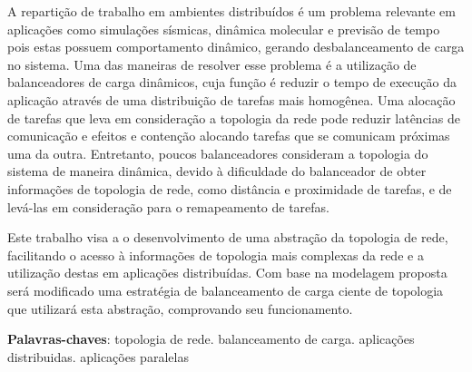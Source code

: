 \documentclass[
	12pt,				%
	openright,			%
	twoside,			%
	a4paper,			%
	english,			%
	brazil,				%
	]{abntex2}
\begin{document}
\begin{resumo}

A repartição de trabalho em ambientes distribuídos é um problema relevante em aplicações como simulações sísmicas, dinâmica molecular e previsão de tempo pois estas possuem comportamento dinâmico, gerando desbalanceamento de carga no sistema. 
Uma das maneiras de resolver esse problema é a utilização de balanceadores de carga dinâmicos, cuja função é reduzir o tempo de execução da aplicação através de uma distribuição de tarefas mais homogênea. 
Uma alocação de tarefas que leva em consideração a topologia da rede pode reduzir latências de comunicação e efeitos e contenção alocando tarefas que se comunicam próximas uma da outra.
Entretanto, poucos balanceadores consideram a topologia do sistema de maneira dinâmica, devido à dificuldade do balanceador de obter informações de topologia de rede, como distância e proximidade de tarefas, e de levá-las em consideração para o remapeamento de tarefas.

Este trabalho visa a o desenvolvimento de uma abstração da topologia de rede, facilitando o acesso à informações de topologia mais complexas da rede e a utilização destas em aplicações distribuídas. 
Com base na modelagem proposta será modificado uma estratégia de balanceamento de carga ciente de topologia que utilizará esta abstração, comprovando seu funcionamento. 



 \vspace{\onelineskip}
    
 \noindent
 \textbf{Palavras-chaves}: topologia de rede. balanceamento de carga. aplicações distribuidas. aplicações paralelas
 
\end{resumo}
\cleardoublepage

\end{document}
